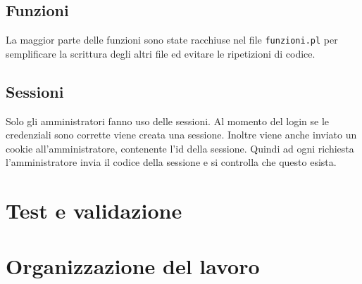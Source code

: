 \documentclass{article}
\begin{document}
	\subsection{Funzioni}
		La maggior parte delle funzioni sono state racchiuse nel file \texttt{funzioni.pl} per semplificare la scrittura degli 
		altri file ed evitare le ripetizioni di codice.
	\subsection{Sessioni}
		Solo gli amministratori fanno uso delle sessioni. Al momento del login se le credenziali sono corrette viene creata una
		sessione. Inoltre viene anche inviato un cookie all'amministratore, contenente l'id della sessione. Quindi ad ogni
		richiesta l'amministratore invia il codice della sessione e si controlla che questo esista.


\section{Test e validazione}




\appendix
	\section{Organizzazione del lavoro}

\end{document}
